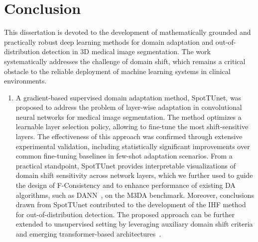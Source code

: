 
\section*{Conclusion}

This dissertation is devoted to the development of mathematically grounded and practically robust deep learning methods for domain adaptation and out-of-distribution detection in 3D medical image segmentation. The work systematically addresses the challenge of domain shift, which remains a critical obstacle to the reliable deployment of machine learning systems in clinical environments.

\begin{enumerate}
	
	\item A gradient-based supervised domain adaptation method, SpotTUnet, was proposed to address the problem of layer-wise adaptation in convolutional neural networks for medical image segmentation. The method optimizes a learnable layer selection policy, allowing to fine-tune the most shift-sensitive layers. The effectiveness of this approach was confirmed through extensive experimental validation, including statistically significant improvements over common fine-tuning baselines in few-shot adaptation scenarios. From a practical standpoint, SpotTUnet provides interpretable visualizations of domain shift sensitivity across network layers, which we further used to guide the design of F-Consistency and to enhance performance of existing DA algorithms, such as DANN~\cite{dann}, on the M3DA benchmark. Moreover, conclusions drawn from SpotTUnet contributed to the development of the IHF method for out-of-distribution detection. The proposed approach can be further extended to unsupervised setting by leveraging auxiliary domain shift criteria and emerging transformer-based architectures~\cite{unetr}.
        

\end{enumerate}
